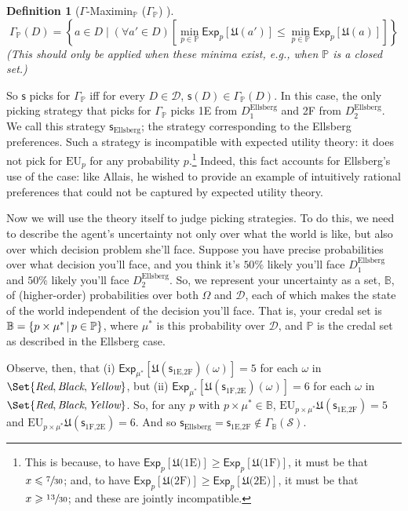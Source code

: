 \documentclass[a4paper,final]{article}
\newtheorem{definition}[theorem]{Definition}
\renewcommand\P{\mathbb{P}} %
\newcommand\Exp{\mathsf{Exp}}
\newcommand\EU{\mathrm{EU}}
\newcommand\U{\mathfrak{U}} %
\newcommand\Maximin{\Gamma}
\newcommand{\D}{\mathcal{D}}
\renewcommand\S{\mathcal{S}}
\newcommand\s{\mathsf{s}}
\newcommand{\IB}{\mathbb{B}}
\newcommand{\IP}{\P}
\newcommand\SetDelimiter[1][]{
	\nonscript\,#1\vert \allowbreak \nonscript\,\mathopen{}}
\providecommand\given{\SetDelimiter}
\renewcommand{\leq}{\leqslant}
\renewcommand{\geq}{\geqslant}
\newenvironment{CCM rewritten}
{\begingroup\color{blue}} %
{\endgroup}              %
\begin{document}
\begin{definition}[$\Gamma$-Maximin$_\IP$ ($\Maximin_\IP$) ]
$$
\Maximin_\IP(D) = \left \{ a \in D \mid (\forall a' \in D)\left [\min_{p \in \IP} \Exp_p[\U(a')] \leq \min_{p \in \IP} \Exp_p[\U(a)] \right ] \right \}
$$
(This should only be applied when these minima exist, e.g., when $\IP$ is a closed set.)
\end{definition}

So $\s$ picks for $\Maximin_\IP$ iff for every $D\in\D$, $\s(D)\in\Maximin_\IP(D)$. In this case, the only picking strategy that picks for $\Maximin_\IP$ picks 1E from $D^{\mathrm{Ellsberg}}_1$ and 2F from $D^{\mathrm{Ellsberg}}_2$. We call this strategy $\s_{\mathrm{Ellsberg}}$; the strategy corresponding to the Ellsberg preferences. Such a strategy is incompatible with expected utility theory: it does not pick for $\EU_p$ for any probability $p$.\footnote{\label{ftnte:Ellsberg not EU}This is because, to have $\Exp_p[\U(\text{1E)}]\geq \Exp_p[\U(\text{1F)}]$, it must be that $x\leq \sfrac{7}{30}$; and, to have  $\Exp_p[\U(\text{2F)}]\geq \Exp_p[\U(\text{2E)}]$, it must be that $x\geq \sfrac{13}{30}$; and these are jointly incompatible. } Indeed, this fact accounts for Ellsberg's use of the case: like Allais, he wished to provide an example of intuitively rational preferences that could not be captured by expected utility theory. 

Now we will use the theory itself to judge picking strategies. To do this, we need to describe the agent's uncertainty not only over what the world is like, but also over which decision problem she'll face. 
Suppose you have precise probabilities over what decision you'll face, and you think it's $50\%$ likely you'll face $D^{\mathrm{Ellsberg}}_1$ and $50\%$ likely you'll face $D^{\mathrm{Ellsberg}}_2$. 
So, we represent your uncertainty as a set, $\IB$, of (higher-order) probabilities over both $\Omega$ and $\D$, each of which makes the state of the world independent of the decision you'll face. 
{That is, your credal set is $\IB=\{p\times\mu^* \given p\in\IP\}$, where $\mu^*$ is this probability over $\D$, and $\IP$ is the credal set as described in the Ellsberg case.}

Observe, then, that (i) $\Exp_{\mu^*}[\U(\s_{\text{1E,2F}})(\omega)]=5$ for each $\omega$ in $\Set{\emph{Red}, \emph{Black}, \emph{Yellow}}$, but (ii) $\Exp_{\mu^*}[\U(\s_{\text{1F,2E}})(\omega)]=6$ for each $\omega$ in $\Set{\emph{Red}, \emph{Black}, \emph{Yellow}}$. So, for any $p$ with $p\times \mu^*\in \IB$,  $\EU_{p\times\mu^*}\U(\s_{\text{1E,2F}})=5$ and  $\EU_{p\times\mu^*}\U(\s_{\text{1F,2E}})=6$. And so $\s_{\mathrm{Ellsberg}}=\s_{\text{1E,2F}}\notin\Maximin_{\IB}(\S)$. 
\end{document}

